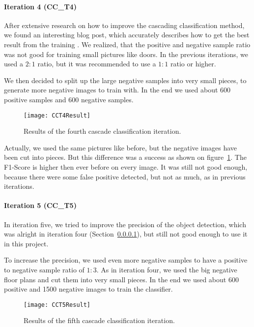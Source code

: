 \paragraph{Iteration 4 (CC\_T4)}
\label{sub:CCT4}

After extensive research on how to improve the cascading classification method, we found an interesting blog post, which accurately describes how to get the best result from the training \citep{ball}. We realized, that the positive and negative sample ratio was not good for training small pictures like doors. In the previous iterations, we used a $2:1$ ratio, but it was recommended to use a $1:1$ ratio or higher.

We then decided to split up the large negative samples into very small pieces, to generate more negative images to train with. In the end we used about 600 positive samples and 600 negative samples.

\begin{figure}[H]
	\centering
	\texttt{[image: CCT4Result]}
	\caption{Results of the fourth cascade classification iteration.}
	\label{fig:CCT4Result}
\end{figure}

Actually, we used the same pictures like before, but the negative images have been cut into pieces. But this difference was a success as shown on figure~\ref{fig:CCT4Result}. The F1-Score is higher then ever before on every image. It was still not good enough, because there were some false positive detected, but not as much, as in previous iterations.

\paragraph{Iteration 5 (CC\_T5)}
\label{sub:CCT5}

In iteration five, we tried to improve the precision of the object detection, which was alright in iteration four (Section~\ref{sub:CCT4}), but still not good enough to use it in this project.

To increase the precision, we used even more negative samples to have a positive to negative sample ratio of $1:3$. As in iteration four, we used the big negative floor plans and cut them into very small pieces. In the end we used about 600 positive and 1500 negative images to train the classifier.

\begin{figure}[H]
	\centering
	\texttt{[image: CCT5Result]}
	\caption{Results of the fifth cascade classification iteration.}
	\label{fig:CCT5Result}
\end{figure}

